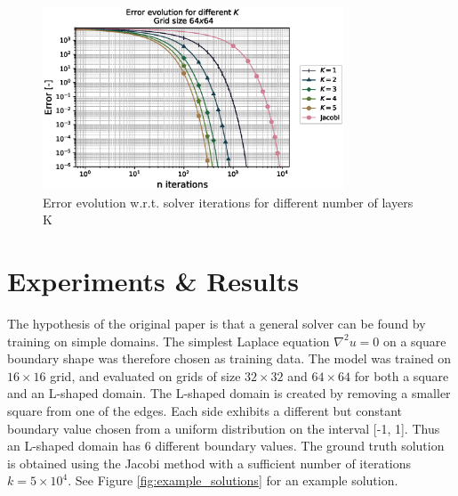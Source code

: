 \documentclass{rescience} %
\begin{document}
\begin{figure}[h]
\centering
\includegraphics[width=0.8\textwidth]{figs/error_k.eps}
\caption{Error evolution w.r.t. solver iterations for different number of layers K}
\label{fig:error_K}
\end{figure}

\section{Experiments \& Results}

The hypothesis of the original paper is that a general solver can be found by training on simple domains. The simplest Laplace equation $\nabla^2u = 0$ on a square boundary shape was therefore chosen as training data.
The model was trained on $16\times16$ grid, and evaluated on grids of size $32\times32$ and $64\times64$ for both a square and an L-shaped domain. 
The L-shaped domain is created by removing a smaller square from one of the edges. Each side exhibits a different but constant boundary value chosen from a uniform distribution on the interval [-1, 1]. Thus an L-shaped domain has 6 different boundary values. The ground truth solution is obtained using the Jacobi method with a sufficient number of iterations $k=5\times10^4$. See Figure \ref{fig:example_solutions} for an example solution.
\end{document}
